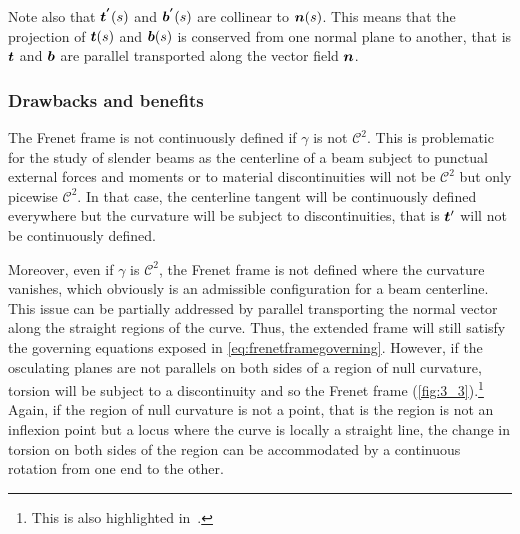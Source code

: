 Note also that $\boldsymbol{t^{'}}(s)$ and $\boldsymbol{b^{'}}(s)$ are collinear to $\boldsymbol{n}(s)$. This means that the projection of $\boldsymbol{t}(s)$ and $\boldsymbol{b}(s)$ is conserved from one normal plane to another, that is $\boldsymbol{t}$ and $\boldsymbol{b}$ are parallel transported along the vector field $\boldsymbol{n}$.

\subsubsection{Drawbacks and benefits}\label{sec:frenetdrawbacks}

The Frenet frame is not continuously defined if $\gamma$ is not $\mathcal{C}^2$. This is problematic for the study of slender beams as the centerline of a beam subject to punctual external forces and moments or to material discontinuities will not be $\mathcal{C}^2$ but only picewise $\mathcal{C}^2$. In that case, the centerline tangent will be continuously defined everywhere but the curvature will be subject to discontinuities, that is $\boldsymbol{t}'$ will not be continuously defined.

Moreover, even if $\gamma$ is $\mathcal{C}^2$, the Frenet frame is not defined where the curvature vanishes, which obviously is an admissible configuration for a beam centerline. This issue can be partially addressed by parallel transporting the normal vector along the straight regions of the curve. Thus, the extended frame will still satisfy the governing equations exposed in \cref{eq:frenetframegoverning}. However, if the osculating planes are not parallels on both sides of a region of null curvature, torsion will be subject to a discontinuity and so the Frenet frame (\cref{fig:3_3}).\footnote{This is also highlighted in~\cite{Bloomenthal1990, Wang2008}.} Again, if the region of null curvature is not a point, that is the region is not an inflexion point but a locus where the curve is locally a straight line, the change in torsion on both sides of the region can be accommodated by a continuous rotation from one end to the other.

